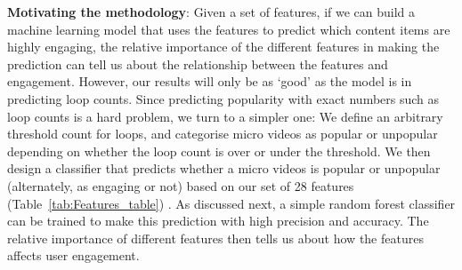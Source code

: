 \noindent\textbf{Motivating the methodology}: 
 Given a set of features, if we can build a machine learning model that uses the features to predict which content items are highly engaging, the relative importance of the different features in making the prediction can tell us about the relationship between the features and engagement. However, our results will only be as `good' as the model is in predicting loop counts. Since predicting popularity with exact numbers such as loop counts is a hard problem, we turn to a simpler one: We define an arbitrary threshold count for loops, and categorise micro videos as popular or unpopular depending on whether the loop count is over or under the threshold.  We then design a classifier that predicts whether a micro videos is popular or unpopular (alternately, as engaging or not) based on our set of 28 features (Table~\ref{tab:Features_table}) . As discussed next, a simple random forest classifier can be trained to make this prediction with high precision and accuracy. The relative importance of different features then tells us about how the features affects user engagement.

